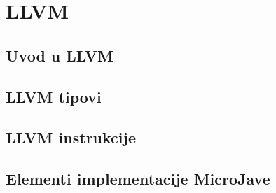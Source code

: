 \chapter{LLVM}

\section{Uvod u LLVM}

\section{LLVM tipovi}

\section{LLVM instrukcije}

\section{Elementi implementacije MicroJave}
